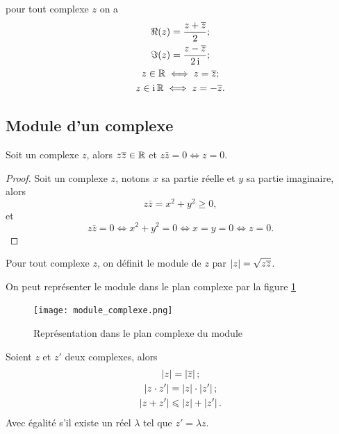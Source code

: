 \begin{prop}
  pour tout complexe \(z\) on a
  \begin{gather}
    \Re(z)=\frac{z+\overline{z}}{2};\\
    \Im(z)=\frac{z-\overline{z}}{2 \operatorname{i}};\\
    z \in \mathbb{R} \iff z=\overline{z};\\
    z \in \operatorname{i}\mathbb{R} \iff z=-\overline{z}.
  \end{gather}
\end{prop}
%
\subsection{Module d'un complexe}
\label{subsec:modulecomplexe}
\begin{prop}
  Soit un complexe \(z\), alors \(z \overline{z} \in \mathbb{R}\) et \(z \bar{z}=0 \iff z = 0\).
\end{prop}
\begin{proof}
  Soit un complexe \(z\), notons \(x\) sa partie réelle et \(y\) sa partie imaginaire, alors
  \begin{equation}
    z \bar{z}=x^2+y^2 \geqslant 0,
  \end{equation}
  et
  \begin{equation}
    z \bar{z}=0 \iff x^2+y^2=0 \iff x=y=0 \iff z=0.
  \end{equation}
\end{proof}
%
\begin{defdef}
  Pour tout complexe \(z\), on définit le module de \(z\) par \(\left\lvert z\right\rvert=\sqrt{z \overline{z}}\).
\end{defdef}
%
On peut représenter le module dans le plan complexe par la figure \ref{fig:moduleComplexe}
\begin{figure}
    \centering
    \texttt{[image: module\_complexe.png]}
    \caption{Représentation dans le plan complexe du module}
    \label{fig:moduleComplexe}
\end{figure}
%
\begin{prop}
  Soient \(z\) et \(z'\) deux complexes, alors
  \begin{gather}
    \left\lvert z\right\rvert=\left\lvert\overline{z}\right\rvert; \\
    \left\lvert z \cdot z'\right\rvert=\left\lvert z\right\rvert \cdot \left\lvert z'\right\rvert; \\
    \left\lvert z+z'\right\rvert\leqslant\left\lvert z\right\rvert+\left\lvert z'\right\rvert.
  \end{gather}
  Avec égalité s'il existe un réel \(\lambda\) tel que \(z'=\lambda z\).
\end{prop}
